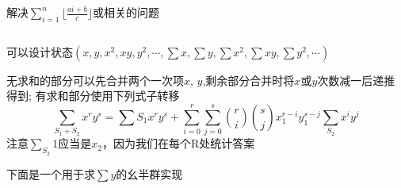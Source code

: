 解决$\sum_{i=1}^{n} \lfloor \frac{ai+b}{c} \rfloor$或相关的问题

\inputminted{cpp}{Math/euclid.cpp}

可以设计状态$(x, y, x^2, xy, y^2, \cdots, \sum x, \sum y, \sum x^2, \sum xy, \sum y^2, \cdots)$

无求和的部分可以先合并两个一次项$x$, $y$,剩余部分合并时将$x$或$y$次数减一后递推得到;
有求和部分使用下列式子转移
$$
\sum_{S_1+S_2}x^r y^s = \sum{S_1}x^r y^s + 
\sum_{i=0}^{r}\sum_{j=0}^{s}\binom{r}{i}\binom{s}{j}x_1^{r-i}y_1^{s-j}\sum_{S_2}x^i y^j
$$
注意$\sum_{S_2}1$应当是$x_2$，因为我们在每个R处统计答案

下面是一个用于求$\sum y$的幺半群实现

\inputminted{cpp}{Math/euclid_monoid.cpp}
